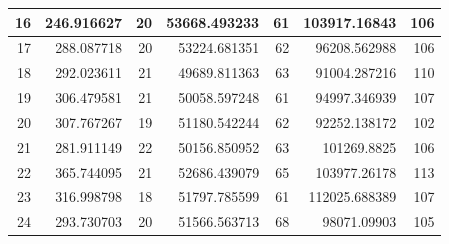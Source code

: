 \begin{table}
\begin{adjustwidth}{}{}
{{\begin{tabular}{|r|r|r|r|r|r|r|}
					\hline
					16                                         & 246.916627                   & 20                                    & 53668.493233                   & 61                                    & 103917.16843                 & 106                                    \\ 
					\hline
					17                                         & 288.087718                   & 20                                    & 53224.681351                   & 62                                    & 96208.562988                 & 106                                    \\ 
					\hline
					18                                         & 292.023611                   & 21                                    & 49689.811363                   & 63                                    & 91004.287216                 & 110                                    \\ 
					\hline
					19                                         & 306.479581                   & 21                                    & 50058.597248                   & 61                                    & 94997.346939                 & 107                                    \\ 
					\hline
					20                                         & 307.767267                   & 19                                    & 51180.542244                   & 62                                    & 92252.138172                 & 102                                    \\ 
					\hline
					21                                         & 281.911149                   & 22                                    & 50156.850952                   & 63                                    & 101269.8825                  & 106                                    \\ 
					\hline
					22                                         & 365.744095                   & 21                                    & 52686.439079                   & 65                                    & 103977.26178                 & 113                                    \\ 
					\hline
					23                                         & 316.998798                   & 18                                    & 51797.785599                   & 61                                    & 112025.688389                & 107                                    \\ 
					\hline
					24                                         & 293.730703                   & 20                                    & 51566.563713                   & 68                                    & 98071.09903                  & 105                                    \\ 

\end{tabular}}}
\end{adjustwidth}
\end{table}
